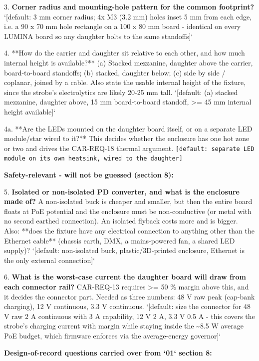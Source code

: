 \documentclass[11pt,a4paper]{article}
\begin{document}
3. \textbf{Corner radius and mounting-hole pattern for the common footprint?} `{[}default: 3 mm corner radius; 4x M3 (3.2 mm) holes inset 5 mm from each edge, i.e. a 90 x 70 mm hole rectangle on a 100 x 80 mm board - identical on every LUMINA board so any daughter bolts to the same standoffs{]}`

4. {*}{*}How do the carrier and daughter sit relative to each other, and how much internal height is available?{*}{*} (a) Stacked mezzanine, daughter above the carrier, board-to-board standoffs; (b) stacked, daughter below; (c) side by side / coplanar, joined by a cable. Also state the usable internal height of the fixture, since the strobe's electrolytics are likely 20-25 mm tall. `{[}default: (a) stacked mezzanine, daughter above, 15 mm board-to-board standoff, \textgreater{}= 45 mm internal height available{]}`

4a. {*}{*}Are the LEDs mounted on the daughter board itself, or on a separate LED module/star wired to it?{*}{*} This decides whether the enclosure has one hot zone or two and drives the CAR-REQ-18 thermal argument. \texttt{{[}default: separate LED module on its own heatsink, wired to the daughter{]}}

\textbf{Safety-relevant - will not be guessed (section 8):}

5. \textbf{Isolated or non-isolated PD converter, and what is the enclosure made of?} A non-isolated buck is cheaper and smaller, but then the entire board floats at PoE potential and the enclosure must be non-conductive (or metal with no second earthed connection). An isolated flyback costs more and is bigger. Also: {*}{*}does the fixture have any electrical connection to anything other than the Ethernet cable{*}{*} (chassis earth, DMX, a mains-powered fan, a shared LED supply)? `{[}default: non-isolated buck, plastic/3D-printed enclosure, Ethernet is the only external connection{]}`

6. \textbf{What is the worst-case current the daughter board will draw from each connector rail?} CAR-REQ-13 requires \textgreater{}= 50 \% margin above this, and it decides the connector part. Needed as three numbers: 48 V raw peak (cap-bank charging), 12 V continuous, 3.3 V continuous. `{[}default: size the connector for 48 V raw 2 A continuous with 3 A capability, 12 V 2 A, 3.3 V 0.5 A - this covers the strobe's charging current with margin while staying inside the \textasciitilde{}8.5 W average PoE budget, which firmware enforces via the average-energy governor{]}`

\textbf{Design-of-record questions carried over from `01` section 8:}
\end{document}
